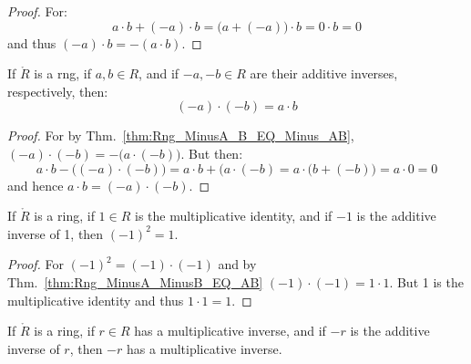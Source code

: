 \documentclass{article}                                                        %
\begin{document}
        \begin{proof}
            For:
            \begin{equation}
                a\cdot{b}+(\minus{a})\cdot{b}
                =\big(a+(\minus{a})\big)\cdot{b}
                =0\cdot{b}
                =0
            \end{equation}
            and thus $(\minus{a})\cdot{b}=\minus(a\cdot{b})$.
        \end{proof}
        \begin{theorem}
            \label{thm:Rng_MinusA_MinusB_EQ_AB}%
            If $\ring{R}$ is a rng, if $a,b\in{R}$, and if
            $\minus{a},\minus{b}\in{R}$ are their additive inverses,
            respectively, then:
            \begin{equation}
                (\minus{a})\cdot(\minus{b})=a\cdot{b}
            \end{equation}
        \end{theorem}
        \begin{proof}
            For by Thm.~\ref{thm:Rng_MinusA_B_EQ_Minus_AB},
            $(\minus{a})\cdot(\minus{b})=\minus\big(a\cdot(\minus{b})\big)$. But
            then:
            \begin{equation}
                a\cdot{b}-\big((\minus{a})\cdot(\minus{b})\big)
                =a\cdot{b}+(a\cdot(\minus{b})
                =a\cdot\big(b+(\minus{b})\big)
                =a\cdot{0}
                =0
            \end{equation}
            and hence $a\cdot{b}=(\minus{a})\cdot(\minus{b})$.
        \end{proof}
        \begin{theorem}
            \label{thm:Ring_Minus_1_Squared}%
            If $\ring{R}$ is a ring, if $1\in{R}$ is the multiplicative
            identity, and if $\minus{1}$ is the additive inverse of 1, then
            $(\minus{1})^{2}=1$.
        \end{theorem}
        \begin{proof}
            For $(\minus{1})^{2}=(\minus{1})\cdot(\minus{1})$ and by
            Thm.~\ref{thm:Rng_MinusA_MinusB_EQ_AB}
            $(\minus{1})\cdot(\minus{1})=1\cdot{1}$. But 1 is the multiplicative
            identity and thus $1\cdot{1}=1$.
        \end{proof}
        \begin{theorem}
            If $\ring{R}$ is a ring, if $r\in{R}$ has a multiplicative inverse,
            and if $\minus{r}$ is the additive inverse of $r$, then $\minus{r}$
            has a multiplicative inverse.
        \end{theorem}
\end{document}
